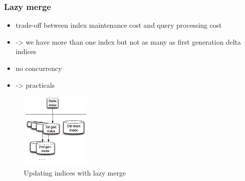 \subsubsection{Lazy merge}
\begin{itemize}
    \item trade-off between index maintenance cost and query processing cost
    \item -> we have more than one index but not as many as first generation delta indices
    \item no concurrency
    \item -> practicals
\end{itemize}
\begin{figure}[ht]
    \centering
    \includegraphics[width=0.3\textwidth]{figures/index_lazy_merge.png}
    \caption{Updating indices with lazy merge}
\end{figure}
